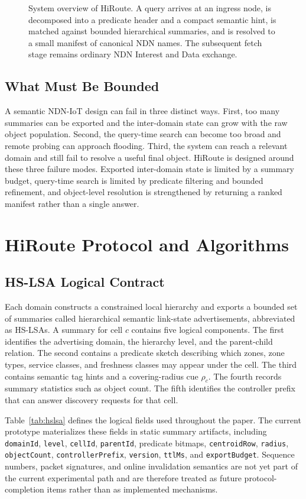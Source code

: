 \documentclass[journal]{IEEEtran}
\newcommand{\sysname}{HiRoute}
\newcommand{\hslsa}{HS-LSA}
\newcommand{\placeholderbox}[2]{%
  \begin{center}
  \fbox{\parbox[c][#1][c]{0.93\linewidth}{\centering #2}}
  \end{center}}
\newcommand{\figstarplaceholder}[4]{%
\begin{figure}[t]
\centering
\placeholderbox{#2}{#3}
\caption{#1}
\label{#4}
\end{figure}}
\begin{document}
\figstarplaceholder{System overview of \sysname{}. A query arrives at an ingress node, is decomposed into a predicate header and a compact semantic hint, is matched against bounded hierarchical summaries, and is resolved to a small manifest of canonical NDN names. The subsequent fetch stage remains ordinary NDN Interest and Data exchange.}{4.9cm}{\textit{System overview figure placeholder.}}{fig:overview}

\subsection{What Must Be Bounded}

A semantic NDN-IoT design can fail in three distinct ways. First, too many summaries can be exported and the inter-domain state can grow with the raw object population. Second, the query-time search can become too broad and remote probing can approach flooding. Third, the system can reach a relevant domain and still fail to resolve a useful final object. \sysname{} is designed around these three failure modes. Exported inter-domain state is limited by a summary budget, query-time search is limited by predicate filtering and bounded refinement, and object-level resolution is strengthened by returning a ranked manifest rather than a single answer.

\section{HiRoute Protocol and Algorithms}

\subsection{HS-LSA Logical Contract}

Each domain constructs a constrained local hierarchy and exports a bounded set of summaries called hierarchical semantic link-state advertisements, abbreviated as \hslsa{}s. A summary for cell $c$ contains five logical components. The first identifies the advertising domain, the hierarchy level, and the parent-child relation. The second contains a predicate sketch describing which zones, zone types, service classes, and freshness classes may appear under the cell. The third contains semantic tag hints and a covering-radius cue $\rho_c$. The fourth records summary statistics such as object count. The fifth identifies the controller prefix that can answer discovery requests for that cell.

Table~\ref{tab:hslsa} defines the logical fields used throughout the paper. The current prototype materializes these fields in static summary artifacts, including \texttt{domainId}, \texttt{level}, \texttt{cellId}, \texttt{parentId}, predicate bitmaps, \texttt{centroidRow}, \texttt{radius}, \texttt{objectCount}, \texttt{controllerPrefix}, \texttt{version}, \texttt{ttlMs}, and \texttt{exportBudget}. Sequence numbers, packet signatures, and online invalidation semantics are not yet part of the current experimental path and are therefore treated as future protocol-completion items rather than as implemented mechanisms.
\end{document}
